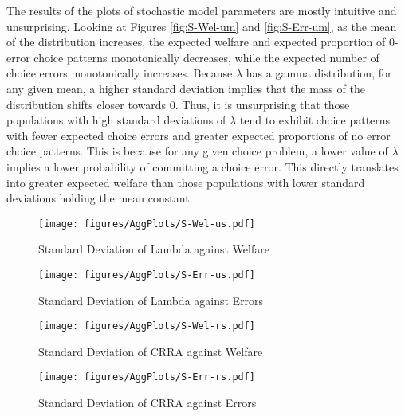 \documentclass[../main.tex]{subfiles}
\begin{document}
The results of the plots of stochastic model parameters are mostly intuitive and unsurprising.
Looking at Figures \ref{fig:S-Wel-um} and \ref{fig:S-Err-um}, as the mean of the distribution increases, the expected welfare and expected proportion of 0-error choice patterns monotonically decreases, while the expected number of choice errors monotonically increases.
Because $\lambda$ has a gamma distribution, for any given mean, a higher standard deviation implies that the mass of the distribution shifts closer towards $0$.
Thus, it is unsurprising that those populations with high standard deviations of $\lambda$ tend to exhibit choice patterns with fewer expected choice errors and greater expected proportions of no error choice patterns.
This is because for any given choice problem, a lower value of $\lambda$ implies a lower probability of committing a choice error.{\footnotemark}
This directly translates into greater expected welfare than those populations with lower standard deviations holding the mean constant.

\addtocounter{footnote}{-1}

\begin{figure}[h!]
	\center
	\caption{Standard Deviation of Lambda against Welfare}
	\texttt{[image: figures/AggPlots/S-Wel-us.pdf]}
	\label{fig:S-Wel-us}
\end{figure}

\begin{figure}[h!]
	\center
	\caption{Standard Deviation of Lambda against Errors}
	\texttt{[image: figures/AggPlots/S-Err-us.pdf]}
	\label{fig:S-Err-us}
\end{figure}

\begin{figure}[h!]
	\center
	\caption{Standard Deviation of CRRA against Welfare}
	\texttt{[image: figures/AggPlots/S-Wel-rs.pdf]}
	\label{fig:S-Wel-rs}
\end{figure}

\begin{figure}[h!]
	\center
	\caption{Standard Deviation of CRRA against Errors}
	\texttt{[image: figures/AggPlots/S-Err-rs.pdf]}
	\label{fig:S-Err-rs}
\end{figure}
\end{document}
